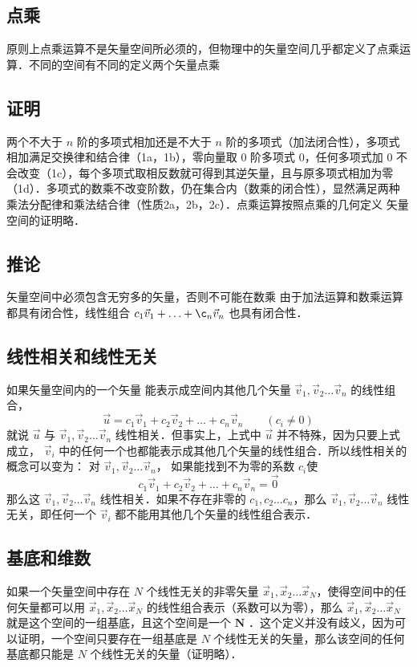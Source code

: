 \subsection{点乘}
原则上点乘运算不是矢量空间所必须的，但物理中的矢量空间几乎都定义了点乘运算．不同的空间有不同的定义两个矢量点乘

\subsection{证明}
两个不大于 $n$ 阶的多项式相加还是不大于 $n$ 阶的多项式（加法闭合性），多项式相加满足交换律和结合律（1a，1b），零向量取 0 阶多项式 0，任何多项式加 0 不会改变（1c），每个多项式取相反数就可得到其逆矢量，且与原多项式相加为零（1d）．多项式的数乘不改变阶数，仍在集合内（数乘的闭合性），显然满足两种乘法分配律和乘法结合律（性质2a，2b，2c）．点乘运算按照点乘的几何定义%
矢量空间的证明略．

\subsection{推论}
矢量空间中必须包含无穷多的矢量，否则不可能在数乘
由于加法运算和数乘运算都具有闭合性，线性组合 $c_1\vec v_1+\ldots +\c_n\vec v_n$ 也具有闭合性．

\subsection{线性相关和线性无关}

如果矢量空间内的一个矢量 能表示成空间内其他几个矢量 $\vec v_1, \vec v_2 \dots \vec v_n$ 的线性组合，
\begin{equation}
\vec u = c_1 \vec v_1 + c_2 \vec v_2 + \ldots + c_n \vec v_n \qquad (c_i \ne 0)
\end{equation} 
就说 $\vec u$ 与 $\vec v_1, \vec v_2 \dots \vec v_n$ 线性相关．但事实上，上式中 $\vec u$ 并不特殊，因为只要上式成立， $\vec v_i$ 中的任何一个也都能表示成其他几个矢量的线性组合．所以线性相关的概念可以变为： 对 $\vec v_1, \vec v_2 \dots \vec v_n$， 如果能找到不为零的系数 $c_i$使
\begin{equation}
c_1 \vec v_1 + c_2 \vec v_2+ \ldots + c_n \vec v_n = \vec 0
\end{equation} 
那么这 $\vec v_1, \vec v_2 \dots \vec v_n$ 线性相关．如果不存在非零的 $c_1, c_2 \dots c_n$，那么 $\vec v_1, \vec v_2 \dots \vec v_n$ 线性无关，即任何一个 $\vec v_i$ 都不能用其他几个矢量的线性组合表示．

\subsection{基底和维数}
如果一个矢量空间中存在 $N$ 个线性无关的非零矢量 $\vec x_1, \vec x_2 \dots \vec x_N$，使得空间中的任何矢量都可以用 $\vec x_1, \vec x_2 \dots \vec x_N$ 的线性组合表示（系数可以为零），那么 $\vec x_1, \vec x_2 \dots \vec x_N$ 就是这个空间的一组基底，且这个空间是一个 $\mathbf{N}$ ．这个定义并没有歧义，因为可以证明，一个空间只要存在一组基底是 $N$ 个线性无关的矢量，那么该空间的任何基底都只能是 $N$ 个线性无关的矢量（证明略）．
